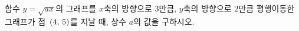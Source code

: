 \hspace*{2mm}\begin{minipage}[t]{\dimexpr\linewidth-2mm\relax}\vspace{0pt}
함수 $y=\sqrt{ax}$의 그래프를 $x$축의 방향으로 $3$만큼, $y$축의 방향으로 $2$만큼 평행이동한 그래프가 점~$(4,\mkern3mu 5)$를 지날 때, 상수 $a$의 값을 구하시오.\end{minipage}
